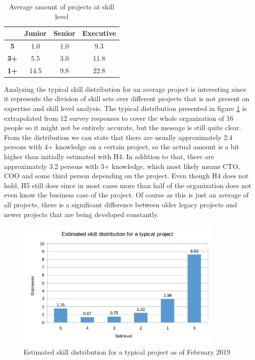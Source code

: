\begin{table}[H]
	\begin{center}
		\begin{tabular}{|c|c|c|c|}
			\hline
            	 		& \textbf{Junior} & \textbf{Senior} & \textbf{Executive} \\ \hline
			\textbf{5}  & 1.0             & 1.0             & 9.3                \\ \hline
			\textbf{3+} & 5.5             & 3.0             & 11.8               \\ \hline
			\textbf{1+} & 14.5            & 9.8             & 22.8               \\ \hline
		\end{tabular}
		
		\caption{Average amount of projects at skill level}
		\label{table:projects-per-level-before}
	\end{center}
\end{table}

Analyzing the typical skill distribution for an average project is interesting since it represents the division of skill sets over different projects that is not present
on expertise and skill level analysis. The typical distribution presented in figure \ref{fig:skill-distribution-before} is extrapolated from 12 survey responses to cover
the whole organization of 16 people so it might not be entirely accurate, but the message is still quite clear. From the distribution we can state that there are usually
approximately 2.4 persons with 4+ knowledge on a certain project, so the actual amount is a bit higher than initially estimated with H4. In addition to that, there are
approximately 3.2 persons with 3+ knowledge, which most likely means CTO, COO and some third person depending on the project. Even though H4 does not hold, H5 still does
since in most cases more than half of the organization does not even know the business case of the project. Of course as this is just an average of all projects, there is
a significant difference between older legacy projects and newer projects that are being developed constantly.

\begin{figure}[ht]
  \begin{center}
    \includegraphics[width=0.9\textwidth]{images/skill-distribution-before-2.png}
    \caption{Estimated skill distribution for a typical project as of February 2019}
    \label{fig:skill-distribution-before}
  \end{center}
\end{figure}

